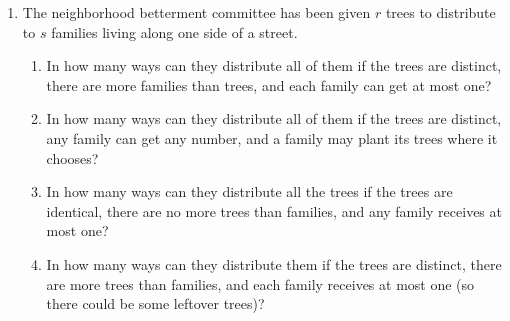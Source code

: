 {\begin{enumerate}
\begin{enumerate}
\item  In how many ways may we pass out $k$ distinct pieces of candy to
$n$ children?





\item  In how many ways may we pass out $k$ identical pieces of candy to
$n$ children so that each gets at most one?  (Assume $k\le n$.) 


\item  In how many ways may we pass out $k$ distinct pieces of candy to
$n$ children so that each gets at most one?  (Assume $k\le n$.)

\item In how many ways may we pass out $k$ distinct pieces of
candy to $n$ children so that each gets at least one?  (Assume $k\ge n$.)

\item  In how many ways may we pass out $k$ identical pieces of candy to
$n$ children so that each gets at least one?  (Assume $k\ge n$.)
\end{enumerate}

\item The neighborhood betterment committee has been given $r$ trees to
distribute to $s$ families living along one side of a street.
\begin{enumerate}
\item In how many ways can they distribute all of
them if the trees are distinct, there are more families than trees, and
each family can get at most one? 

\item In how many ways can they
distribute all of them if the trees are distinct, any family can get any
number, and a family may plant its trees where it chooses?

\item In how many ways can they distribute all the trees if the trees are
identical, there are no more trees than families,   and any family
receives at most one?   

\item In how many ways can they distribute them if the trees are
distinct, there are more trees than families, and each family
receives at most one (so there could be some leftover trees)?


\end{enumerate}
\end{enumerate}}
